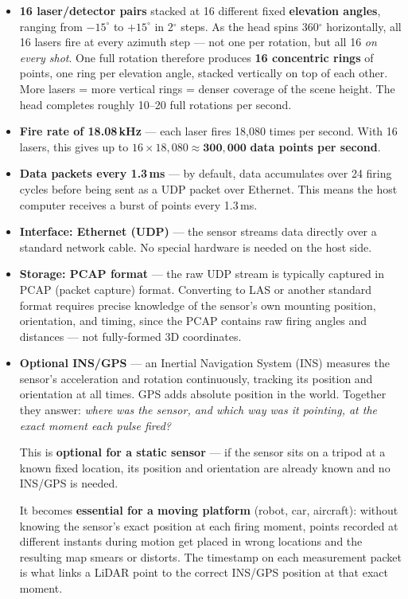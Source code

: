 \documentclass[12pt, a4paper]{article}
\begin{document}
\begin{itemize}[leftmargin=1.4em,itemsep=3pt]
  \item \textbf{16 laser/detector pairs} stacked at 16 different fixed
    \textbf{elevation angles}, ranging from $-15^\circ$ to $+15^\circ$
    in 2$^\circ$ steps.
    As the head spins 360$^\circ$ horizontally, all 16 lasers fire at
    every azimuth step --- not one per rotation, but all 16 \emph{on
    every shot}.
    One full rotation therefore produces \textbf{16 concentric rings} of
    points, one ring per elevation angle, stacked vertically on top of
    each other.
    More lasers = more vertical rings = denser coverage of the scene
    height.
    The head completes roughly 10--20 full rotations per second.

  \item \textbf{Fire rate of 18.08\,kHz} --- each laser fires 18,080 times
    per second.  With 16 lasers, this gives up to
    $16 \times 18{,}080 \approx \mathbf{300{,}000}$ \textbf{data points
    per second}.

  \item \textbf{Data packets every 1.3\,ms} --- by default, data
    accumulates over 24 firing cycles before being sent as a UDP packet
    over Ethernet.  This means the host computer receives a burst of
    points every 1.3\,ms.

  \item \textbf{Interface: Ethernet (UDP)} --- the sensor streams data
    directly over a standard network cable.  No special hardware is
    needed on the host side.

  \item \textbf{Storage: PCAP format} --- the raw UDP stream is typically
    captured in PCAP (packet capture) format.  Converting to LAS or
    another standard format requires precise knowledge of the sensor's
    own mounting position, orientation, and timing, since the PCAP
    contains raw firing angles and distances --- not fully-formed 3D
    coordinates.

  \item \textbf{Optional INS/GPS} --- an Inertial Navigation System
    (INS) measures the sensor's acceleration and rotation continuously,
    tracking its position and orientation at all times.
    GPS adds absolute position in the world.
    Together they answer: \emph{where was the sensor, and which way was
    it pointing, at the exact moment each pulse fired?}

    This is \textbf{optional for a static sensor} --- if the sensor sits
    on a tripod at a known fixed location, its position and orientation
    are already known and no INS/GPS is needed.

    It becomes \textbf{essential for a moving platform} (robot, car,
    aircraft): without knowing the sensor's exact position at each
    firing moment, points recorded at different instants during motion
    get placed in wrong locations and the resulting map smears or
    distorts.
    The timestamp on each measurement packet is what links a LiDAR point
    to the correct INS/GPS position at that exact moment.
\end{itemize}
\end{document}
